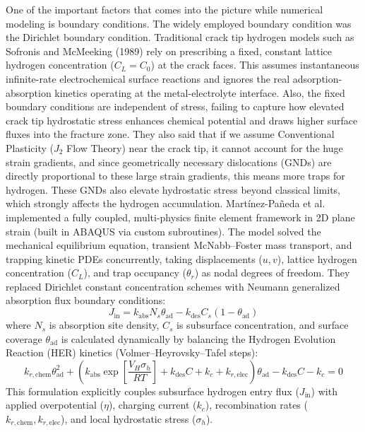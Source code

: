\documentclass[a4paper,12pt,oneside]{report}
\begin{document}
One of the important factors that comes into the picture while numerical modeling is boundary conditions. The widely employed boundary condition was the Dirichlet boundary condition. Traditional crack tip hydrogen models such as Sofronis and McMeeking (1989) rely on prescribing a fixed, constant lattice hydrogen concentration ($C_L = C_0$) at the crack faces. This assumes instantaneous infinite-rate electrochemical surface reactions and ignores the real adsorption-absorption kinetics operating at the metal-electrolyte interface. Also, the fixed boundary conditions are independent of stress, failing to capture how elevated crack tip hydrostatic stress enhances chemical potential and draws higher surface fluxes into the fracture zone. They also said that if we assume Conventional Plasticity ($J_2$ Flow Theory) near the crack tip, it cannot account for the huge strain gradients, and since geometrically necessary dislocations (GNDs) are directly proportional to these large strain gradients, this means more traps for hydrogen. These GNDs also elevate hydrostatic stress beyond classical limits, which strongly affects the hydrogen accumulation. Martínez-Pañeda et al. \cite{MartinezPaneda2020} implemented a fully coupled, multi-physics finite element framework in 2D plane strain (built in ABAQUS via custom subroutines). The model solved the mechanical equilibrium equation, transient McNabb–Foster mass transport, and trapping kinetic PDEs concurrently, taking displacements ($u, v$), lattice hydrogen concentration ($C_L$), and trap occupancy ($\theta_r$) as nodal degrees of freedom. They replaced Dirichlet constant concentration schemes with Neumann generalized absorption flux boundary conditions:
\begin{equation}
    J_{\text{in}} = k_{\text{abs}} N_s \theta_{\text{ad}} - k_{\text{des}} C_s (1 - \theta_{\text{ad}})
\end{equation}
where $N_s$ is absorption site density, $C_s$ is subsurface concentration, and surface coverage $\theta_{\text{ad}}$ is calculated dynamically by balancing the Hydrogen Evolution Reaction (HER) kinetics (Volmer–Heyrovsky–Tafel steps):
\begin{equation}
    k_{r,\text{chem}} \theta_{\text{ad}}^2 + \left( k_{\text{abs}} \exp\left[ \frac{V_H \sigma_h}{RT} \right] + k_{\text{des}} C + k_c + k_{r,\text{elec}} \right) \theta_{\text{ad}} - k_{\text{des}} C - k_c = 0
\end{equation}
This formulation explicitly couples subsurface hydrogen entry flux ($J_{\text{in}}$) with applied overpotential ($\eta$), charging current ($k_c$), recombination rates ($k_{r,\text{chem}}, k_{r,\text{elec}}$), and local hydrostatic stress ($\sigma_h$).
\end{document}
